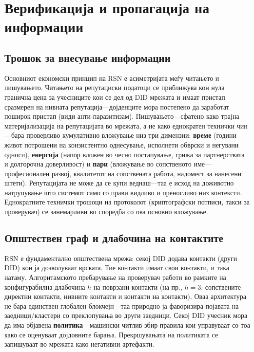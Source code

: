 \documentclass[11pt,a4paper,twocolumn]{article}
\begin{document}
\section{Верификација и пропагација на информации}

\subsection{Трошок за внесување информации}

Основниот економски принцип на RSN е асиметријата меѓу читањето и пишувањето. Читањето на репутациски податоци се приближува кон нула гранична цена за учесниците кои се дел од DID мрежата и имаат пристап сразмерен на нивната репутација---дојденците мора постепено да заработат поширок пристап (види анти-паразитизам). Пишувањето---сфатено како трајна материјализација на репутацијата во мрежата, а не како еднократен технички чин---бара проверливо кумулативно вложување низ три димензии: \textbf{време} (години живот потрошени на конзистентно однесување, исполнети обврски и негувани односи), \textbf{енергија} (напор вложен во чесно постапување, грижа за партнерствата и долгорочна доверливост) и \textbf{пари} (вложување во сопственото име---професионален развој, квалитетот на сопствената работа, надомест за нанесени штети). Репутацијата не може да се купи веднаш---таа е исход на доживотно натрупување што системот само го прави видливо и преносливо низ контексти. Еднократните технички трошоци на протоколот (криптографски потписи, такси за проверувач) се занемарливи во споредба со ова основно вложување.

\subsection{Општествен граф и длабочина на контактите}

RSN е фундаментално општествена мрежа: секој DID додава контакти (други DID) кои ја дозволуваат врската. Тие контакти имаат свои контакти, и така натаму. Алгоритамското пребарување на проверувач работи во рамките на конфигурабилна длабочина $h$ на поврзани контакти (на пр., $h=3$: сопствените директни контакти, нивните контакти и контакти на контакти). Оваа архитектура не бара единствен глобален блокчејн---таа природно ја фаворизира појавата на заедници/кластери со преклопувања во други заедници. Секој DID учесник мора да има објавена \textbf{политика}---машински читлив збир правила кои управуваат со тоа како се оценуваат дојдовните барања. Прекршувањата на политиката се запишуваат во мрежата како негативни артефакти.
\end{document}

